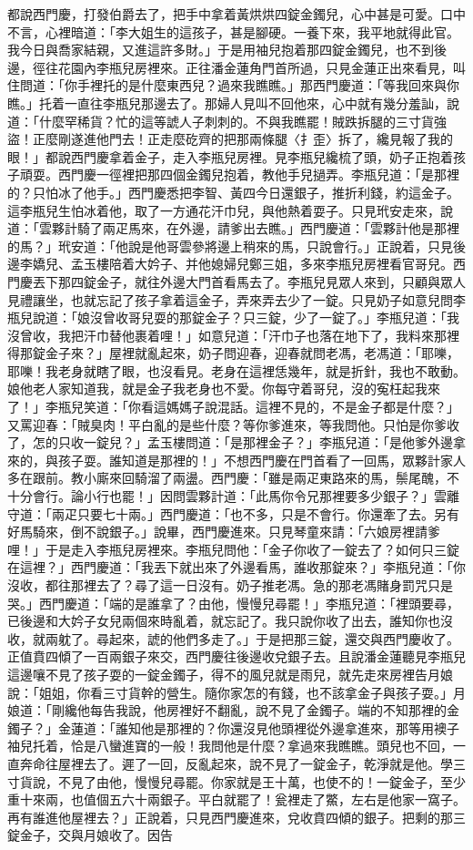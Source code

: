 都說西門慶，打發伯爵去了，把手中拿着黃烘烘四錠金鐲兒，心中甚是可愛。口中不言，心裡暗道：「李大姐生的這孩子，甚是腳硬。一養下來，我平地就得此官。我今日與喬家結親，又進這許多財。」于是用袖兒抱着那四錠金鐲兒，也不到後邊，徑往花園內李瓶兒房裡來。正往潘金蓮角門首所過，只見金蓮正出來看見，叫住問道：「你手裡托的是什麼東西兒？過來我瞧瞧。」那西門慶道：「等我回來與你瞧。」托着一直往李瓶兒那邊去了。那婦人見叫不回他來，心中就有幾分羞訕，說道：「什麼罕稀貨？忙的這等諕人子刺刺的。不與我瞧罷！賊跌拆腿的三寸貨強盜！正麼剛遂進他門去！正走麼矻齊的把那兩條腿〈扌歪〉拆了，纔見報了我的眼！」都說西門慶拿着金子，走入李瓶兒房裡。見李瓶兒纔梳了頭，奶子正抱着孩子頑耍。西門慶一徑裡把那四個金鐲兒抱着，教他手兒撾弄。李瓶兒道：「是那裡的？只怕冰了他手。」西門慶悉把李智、黃四今日還銀子，推折利錢，約這金子。這李瓶兒生怕冰着他，取了一方通花汗巾兒，與他熱着耍子。只見玳安走來，說道：「雲夥計騎了兩疋馬來，在外邊，請爹出去瞧。」西門慶道：「雲夥計他是那裡的馬？」玳安道：「他說是他哥雲參將邊上稍來的馬，只說會行。」正說着，只見後邊李嬌兒、孟玉樓陪着大妗子、并他媳婦兒鄭三姐，多來李瓶兒房裡看官哥兒。西門慶丟下那四錠金子，就往外邊大門首看馬去了。李瓶兒見眾人來到，只顧與眾人見禮讓坐，也就忘記了孩子拿着這金子，弄來弄去少了一錠。只見奶子如意兒問李瓶兒說道：「娘沒曾收哥兒耍的那錠金子？只三錠，少了一錠了。」李瓶兒道：「我沒曾收，我把汗巾替他裹着哩！」如意兒道：「汗巾子也落在地下了，我料來那裡得那錠金子來？」屋裡就亂起來，奶子問迎春，迎春就問老馮，老馮道：「耶嚛，耶嚛！我老身就瞎了眼，也沒看見。老身在這裡恁幾年，就是折針，我也不敢動。娘他老人家知道我，就是金子我老身也不愛。你每守着哥兒，沒的寃枉起我來了！」李瓶兒笑道：「你看這媽媽子說混話。這裡不見的，不是金子都是什麼？」又罵迎春：「賊臭肉！平白亂的是些什麼？等你爹進來，等我問他。只怕是你爹收了，怎的只收一錠兒？」孟玉樓問道：「是那裡金子？」李瓶兒道：「是他爹外邊拿來的，與孩子耍。誰知道是那裡的！」不想西門慶在門首看了一回馬，眾夥計家人多在跟前。教小廝來回騎溜了兩盪。西門慶：「雖是兩疋東路來的馬，鬃尾醜，不十分會行。論小行也罷！」因問雲夥計道：「此馬你令兄那裡要多少銀子？」雲離守道：「兩疋只要七十兩。」西門慶道：「也不多，只是不會行。你還牽了去。另有好馬騎來，倒不說銀子。」說畢，西門慶進來。只見琴童來請：「六娘房裡請爹哩！」于是走入李瓶兒房裡來。李瓶兒問他：「金子你收了一錠去了？如何只三錠在這裡？」西門慶道：「我丟下就出來了外邊看馬，誰收那錠來？」李瓶兒道：「你沒收，都往那裡去了？尋了這一日沒有。奶子推老馮。急的那老馮賭身罰咒只是哭。」西門慶道：「端的是誰拿了？由他，慢慢兒尋罷！」李瓶兒道：「裡頭要尋，已後邊和大妗子女兒兩個來時亂着，就忘記了。我只說你收了出去，誰知你也沒收，就兩躭了。尋起來，諕的他們多走了。」于是把那三錠，還交與西門慶收了。正值賁四傾了一百兩銀子來交，西門慶往後邊收兌銀子去。且說潘金蓮聽見李瓶兒這邊嚷不見了孩子耍的一錠金鐲子，得不的風兒就是雨兒，就先走來房裡告月娘說：「姐姐，你看三寸貨幹的營生。隨你家怎的有錢，也不該拿金子與孩子耍。」月娘道：「剛纔他每告我說，他房裡好不翻亂，說不見了金鐲子。端的不知那裡的金鐲子？」金蓮道：「誰知他是那裡的？你還沒見他頭裡從外邊拿進來，那等用襖子袖兒托着，恰是八蠻進寶的一般！我問他是什麼？拿過來我瞧瞧。頭兒也不回，一直奔命往屋裡去了。遲了一回，反亂起來，說不見了一錠金子，乾淨就是他。學三寸貨說，不見了由他，慢慢兒尋罷。你家就是王十萬，也使不的！一錠金子，至少重十來兩，也值個五六十兩銀子。平白就罷了！瓮裡走了鱉，左右是他家一窩子。再有誰進他屋裡去？」正說着，只見西門慶進來，兌收賁四傾的銀子。把剩的那三錠金子，交與月娘收了。因告